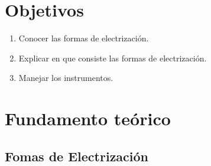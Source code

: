 \begin{center}
	\underline{\Large\scshape\bfseries \dytema}
\end{center}
\section{Objetivos}
\begin{enumerate}[label=\itemcirccz{azzul}{\arabic*},itemsep=2pt,partopsep=6pt]
	\item Conocer las formas de electrización.
	\item Explicar en que consiste las formas de electrización.
	\item Manejar los instrumentos.
\end{enumerate}

\section{Fundamento teórico}
\subsection{Fomas de Electrización}
